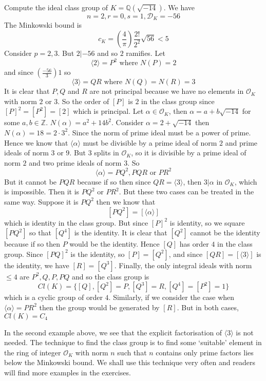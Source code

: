 \begin{example} Compute the ideal class group of $K=\mathbb{Q}(\sqrt{-14})$. We have
$$n=2,r=0,s=1,\mathcal{D}_K=-56$$
The Minkowski bound is
$$c_K=\left(\frac{4}{\pi}\right)\frac{2!}{2^2}\sqrt{56}<5$$
Consider $p=2,3$. But $2|-56$ and so $2$ ramifies. Let
$$\langle 2 \rangle =P^2 \text{ where } N(P)=2$$
and since $(\frac{-56}{3})1$ so
$$\langle 3 \rangle =QR \text{ where } N(Q)=N(R)=3$$
It is clear that $P,Q$ and $R$ are not principal because we have no elements in $\mathcal{O}_K$ with norm $2$ or $3$. So the order of $[P]$ is $2$ in the class group since $[P]^2=[P^2]=[2]$ which is principal.
Let $\alpha \in \mathcal{O}_K$, then $\alpha=a+b\sqrt{-14}$ for some $a,b \in \mathbb{Z}$.
$N(\alpha)=a^2+14b^2$. Consider $\alpha=2+\sqrt{-14}$ then $N(\alpha)=18=2\cdot 3^2$.
Since the norm of prime ideal must be a power of prime. Hence we know that
$\langle \alpha \rangle$ must be divisible by a prime ideal of norm $2$ and prime ideals of norm $3$ or $9$.
But $3$ splits in $\mathcal{O}_K$, so it is divisible by a prime ideal of norm $2$ and two prime ideals of
norm $3$. So
$$\langle \alpha \rangle=PQ^2,PQR \text{ or } PR^2$$
But it cannot be $PQR$ because if so then since $QR=\langle 3 \rangle$, then
$3|\alpha$ in $\mathcal{O}_K$, which is impossible. Then it is $PQ^2$ or $PR^2$. But these two cases can be treated in the same way. Suppose it is $PQ^2$ then we know that
$$[PQ^2]=[\langle \alpha \rangle]$$ which is identity in the class group. But since $[P]^2$ is identity, so
we square $[PQ^2]$ so that $[Q^4]$ is the identity.
It is clear that $[Q^2]$ cannot be the identity because if so then $P$ would be the identity. Hence
$[Q]$ has order $4$ in the class group. Since $[PQ]^2$ is the identity, so $[P]=[Q^2]$, and since
$[QR]=[\langle 3 \rangle]$ is the identity, we have $[R]=[Q^3]$. Finally, the only integral ideals with norm
$\le 4$ are $P^2,Q,P,PQ$ and so the class group is
$$Cl(K)=\{[Q],[Q^2]=P,[Q^3]=R,[Q^4]=[P^2]=1\}$$
which is a cyclic group of order $4$. Similarly, if we consider the case when
$\langle \alpha \rangle=PR^2$ then the group would be generated by $[R]$. But in both cases, $Cl(K)=C_4$
\end{example}
In the second example above, we see that the explicit factorisation of $\langle 3 \rangle$ is not needed. The technique to find the class group is to find some `suitable' element in the ring of integer $\mathcal{O}_K$ with norm $n$ such that $n$ contains only prime factors lies below the Minkowski bound. We shall use this technique very
often and readers will find more examples in the exercises.

